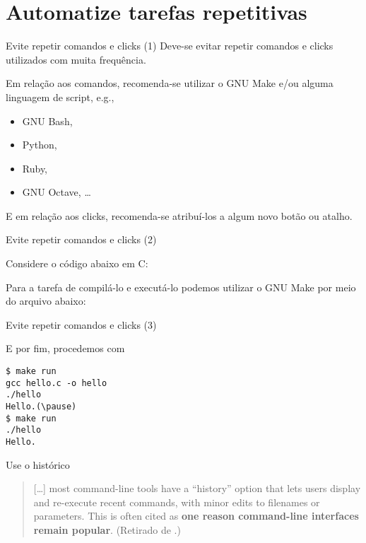 \documentclass[11pt]{beamer}
\begin{document}
\section{Automatize tarefas repetitivas}
\begin{frame}{Evite repetir comandos e clicks (1)}
    Deve-se evitar repetir comandos e clicks utilizados com muita frequência.

    Em relação aos comandos, recomenda-se utilizar o GNU Make e/ou alguma
    linguagem de script, e.g.,
    \begin{itemize}
        \item GNU Bash,
        \item Python,
        \item Ruby,
        \item GNU Octave, \ldots
    \end{itemize}

    E em relação aos clicks, recomenda-se atribuí-los a algum novo botão ou
    atalho.
\end{frame}

\begin{frame}[fragile]{Evite repetir comandos e clicks (2)}
    \begin{example}
        Considere o código abaixo em C:
        
        Para a tarefa de compilá-lo e executá-lo podemos utilizar o GNU Make
        por meio do arquivo abaixo:
        
    \end{example}
\end{frame}

\begin{frame}[fragile]{Evite repetir comandos e clicks (3)}
    \begin{example}[Continuação]
         E por fim,  procedemos com
        \begin{lstlisting}[escapeinside=()]
$ make run
gcc hello.c -o hello
./hello
Hello.(\pause)
$ make run
./hello
Hello.
        \end{lstlisting}
    \end{example}
\end{frame}

\begin{frame}{Use o histórico}
    \begin{quotation}
        [\ldots] most command-line tools have a ``history'' option that
        lets users display and re-execute recent commands, with minor edits to
        filenames or parameters. This is often cited as \textbf{one reason command-line
        interfaces remain popular}. (Retirado de \cite{Aruliah-2012-Best}.)
    \end{quotation}
\end{frame}
\end{document}

